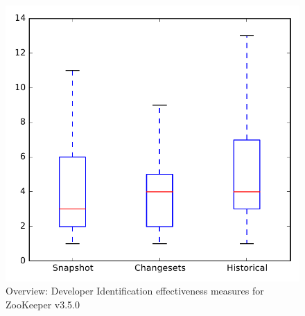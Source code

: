 
\begin{figure}
\centering
\includegraphics[height=0.4\textheight]{figures/dit/all_zookeeper_no_outlier}
\caption{Overview: Developer Identification effectiveness measures for ZooKeeper v3.5.0}
\label{fig:dit:all:zookeeper}
\end{figure}
